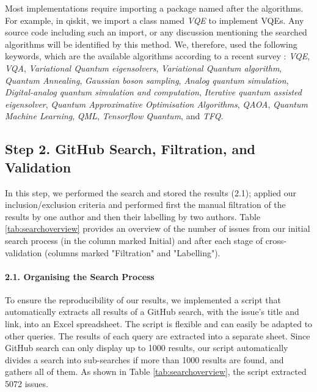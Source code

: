 Most implementations require importing a package named after the algorithms. For example, in qiskit, we import a class named \textit{VQE} to implement VQEs. Any source code including such an import, or any discussion mentioning the searched algorithms will be identified by this method. We, therefore, used the following keywords, which are the available algorithms according to a recent survey \cite{bharti_noisy_2022}: \textit{VQE}, \textit{VQA}, \textit{Variational Quantum eigensolvers}, \textit{Variational Quantum algorithm}, \textit{Quantum Annealing}, \textit{Gaussian boson sampling}, \textit{Analog quantum simulation}, \textit{Digital-analog quantum simulation and computation}, \textit{Iterative quantum assisted eigensolver}, \textit{Quantum Approximative Optimisation Algorithms}, \textit{QAOA}, \textit{Quantum Machine Learning}, \textit{QML}, \textit{Tensorflow Quantum}, and \textit{TFQ}. 



\subsection*{Step 2.  GitHub Search, Filtration, and Validation}
In this step, we performed the search and stored the results (2.1);  applied our inclusion/exclusion criteria and performed first the manual filtration of the results by one author and then their labelling by two authors. 
Table \ref{tab:searchoverview} provides an overview of the number of issues from our initial search process (in the column marked Initial)  and after each stage of cross-validation (columns marked "Filtration" and "Labelling"). 


\paragraph*{2.1. Organising the Search Process} 
To ensure the reproducibility of our results, we implemented a script that automatically extracts all results of a GitHub search, with the issue's title and link, into an Excel spreadsheet. The script is flexible and can easily be adapted to other queries. The results of each query are extracted into a separate sheet. Since GitHub search can only display up to 1000 results, our script automatically divides a search into sub-searches if more than 1000 results are found, and gathers all of them. As shown in Table \ref{tab:searchoverview}, the script extracted 5072 issues.

